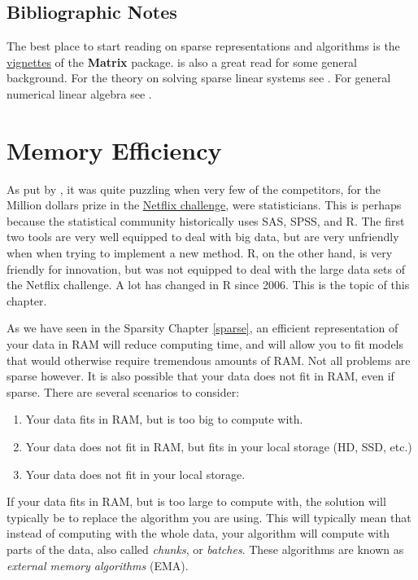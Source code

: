 \documentclass[]{book}
\providecommand{\tightlist}{%
  \setlength{\itemsep}{0pt}\setlength{\parskip}{0pt}}
\theoremstyle{definition}
\theoremstyle{definition}
\theoremstyle{remark}
\begin{document}
\section{Bibliographic Notes}\label{bibliographic-notes-10}

The best place to start reading on sparse representations and algorithms
is the
\href{http://svitsrv=25.epfl.ch/R-doc/library/Matrix/doc/}{vignettes} of
the \textbf{Matrix} package. \citet{gilbert1992sparse} is also a great
read for some general background. For the theory on solving sparse
linear systems see \citet{davis2006direct}. For general numerical linear
algebra see \citet{gentle2012numerical}.

\chapter{Memory Efficiency}\label{memory}

As put by \citet{kane2013scalable}, it was quite puzzling when very few
of the competitors, for the Million dollars prize in the
\href{https://en.wikipedia.org/wiki/Netflix_Prize}{Netflix challenge},
were statisticians. This is perhaps because the statistical community
historically uses SAS, SPSS, and R. The first two tools are very well
equipped to deal with big data, but are very unfriendly when when trying
to implement a new method. R, on the other hand, is very friendly for
innovation, but was not equipped to deal with the large data sets of the
Netflix challenge. A lot has changed in R since 2006. This is the topic
of this chapter.

As we have seen in the Sparsity Chapter \ref{sparse}, an efficient
representation of your data in RAM will reduce computing time, and will
allow you to fit models that would otherwise require tremendous amounts
of RAM. Not all problems are sparse however. It is also possible that
your data does not fit in RAM, even if sparse. There are several
scenarios to consider:

\begin{enumerate}
\def\labelenumi{\arabic{enumi}.}
\tightlist
\item
  Your data fits in RAM, but is too big to compute with.
\item
  Your data does not fit in RAM, but fits in your local storage (HD,
  SSD, etc.)
\item
  Your data does not fit in your local storage.
\end{enumerate}

If your data fits in RAM, but is too large to compute with, the solution
will typically be to replace the algorithm you are using. This will
typically mean that instead of computing with the whole data, your
algorithm will compute with parts of the data, also called
\emph{chunks}, or \emph{batches}. These algorithms are known as
\emph{external memory algorithms} (EMA).
\end{document}
